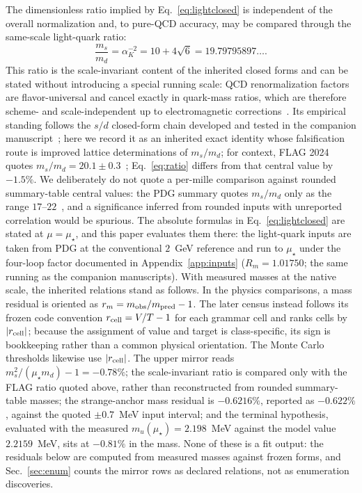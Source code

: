 \documentclass[aps,twocolumn,superscriptaddress,nofootinbib,floatfix]{revtex4-2}
\newcommand{\mstar}{\mu_\star}
\newcommand{\alphaK}{\alpha_K}
\begin{document}
The dimensionless ratio implied by Eq.~\eqref{eq:lightclosed} is independent of the overall normalization and, to pure-QCD accuracy, may be compared through the same-scale light-quark ratio:
\begin{equation}
\boxed{\frac{m_s}{m_d}=\alphaK^{-2}=10+4\sqrt6=19.79795897\ldots.}
\label{eq:ratio}
\end{equation}
This ratio is the scale-invariant content of the inherited closed forms and can be stated without introducing a special running scale: QCD renormalization factors are flavor-universal and cancel exactly in quark-mass ratios, which are therefore scheme- and scale-independent up to electromagnetic corrections~\cite{GasserLeutwyler1982,PDG2026}. Its empirical standing follows the $s/d$ closed-form chain developed and tested in the companion manuscript~\cite{BrilliantMPLA}; here we record it as an inherited exact identity whose falsification route is improved lattice determinations of $m_s/m_d$; for context, FLAG 2024 quotes $m_s/m_d=20.1\pm0.3$~\cite{FLAG2024}; Eq.~\eqref{eq:ratio} differs from that central value by $-1.5\%$. We deliberately do not quote a per-mille comparison against rounded summary-table central values: the PDG summary quotes $m_s/m_d$ only as the range $17$--$22$~\cite{PDG2026}, and a significance inferred from rounded inputs with unreported correlation would be spurious. The absolute formulas in Eq.~\eqref{eq:lightclosed} are stated at $\mu=\mstar$, and this paper evaluates them there: the light-quark inputs are taken from PDG at the conventional $2$~GeV reference and run to $\mstar$ under the four-loop factor documented in Appendix~\ref{app:inputs} ($R_m=1.01750$; the same running as the companion manuscripts). With measured masses at the native scale, the inherited relations stand as follows. In the physics comparisons, a mass residual is oriented as $r_m=m_{\rm obs}/m_{\rm pred}-1$. The later census instead follows its frozen code convention $r_{\rm cell}=V/T-1$ for each grammar cell and ranks cells by $|r_{\rm cell}|$; because the assignment of value and target is class-specific, its sign is bookkeeping rather than a common physical orientation. The Monte Carlo thresholds likewise use $|r_{\rm cell}|$. The upper mirror reads $m_s^2/(\mstar m_d)-1=-0.78\%$; the scale-invariant ratio is compared only with the FLAG ratio quoted above, rather than reconstructed from rounded summary-table masses; the strange-anchor mass residual is $-0.6216\%$, reported as $-0.622\%$, against the quoted $\pm0.7$~MeV input interval; and the terminal hypothesis, evaluated with the measured $m_u(\mstar)=2.198$~MeV against the model value $2.2159$~MeV, sits at $-0.81\%$ in the mass. None of these is a fit output: the residuals below are computed from measured masses against frozen forms, and Sec.~\ref{sec:enum} counts the mirror rows as declared relations, not as enumeration discoveries.
\end{document}
